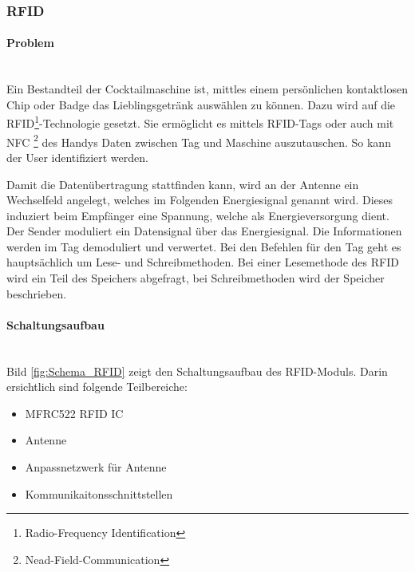 \subsubsection{RFID}
\label{subsubsec:RFID}

\paragraph{Problem}\mbox{}\\

Ein Bestandteil der Cocktailmaschine ist, mittles einem persönlichen kontaktlosen Chip oder Badge das Lieblingsgetränk auswählen zu können. Dazu wird auf die RFID\footnote{Radio-Frequency Identification}-Technologie gesetzt. Sie ermöglicht es mittels RFID-Tags oder auch mit NFC \footnote{Nead-Field-Communication} des Handys Daten zwischen Tag und Maschine auszutauschen. So kann der User identifiziert werden.

Damit die Datenübertragung stattfinden kann, wird an der Antenne ein Wechselfeld angelegt, welches im Folgenden Energiesignal genannt wird. Dieses induziert beim Empfänger eine Spannung, welche als Energieversorgung dient. Der Sender moduliert ein Datensignal über das Energiesignal. Die Informationen werden im Tag demoduliert und verwertet. Bei den Befehlen für den Tag geht es hauptsächlich um Lese- und Schreibmethoden. Bei einer Lesemethode des RFID wird ein Teil des Speichers abgefragt, bei Schreibmethoden wird der Speicher beschrieben.

\paragraph{Schaltungsaufbau}\mbox{}\\

Bild \ref{fig:Schema_RFID} zeigt den Schaltungsaufbau des RFID-Moduls. Darin ersichtlich sind folgende Teilbereiche:

\begin{itemize}
\item MFRC522 RFID IC
\item Antenne
\item Anpassnetzwerk für Antenne
\item Kommunikaitonsschnittstellen
\end{itemize}

